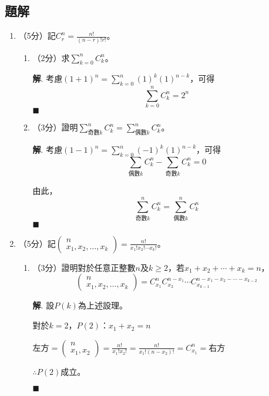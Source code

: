 \documentclass[12pt]{article}
\newenvironment*{sol}{\par \textbf{解}.}{\hfill$\blacksquare$}
\begin{document}
    \subsection*{題解}

    \begin{enumerate}
        \item （5分）記$C_r^n=\frac{n!}{(n-r)!r!}$。\begin{enumerate}
            \item （2分）求$\sum_{k=0}^n C_k^n$。\begin{sol}
                考慮$(1+1)^n=\sum_{k=0}^{n}(1)^k(1)^{n-k}$，可得$$\sum_{k=0}^{n}C_k^n=2^n$$
            \end{sol}
            \item （3分）證明$\sum_{\textrm{奇數}k}^n C_k^n=\sum_{\textrm{偶數}k}^n C_k^n$。\begin{sol}
                考慮$(1-1)^n=\sum_{k=0}^{n}(-1)^k(1)^{n-k}$，可得$$\sum_{\textrm{偶數}k}C_k^n-\sum_{\textrm{奇數}k}C_k^n=0$$

                由此，$$\sum_{\textrm{奇數}k}^n C_k^n=\sum_{\textrm{偶數}k}^n C_k^n$$
            \end{sol}
        \end{enumerate}
        \item （5分）記$\begin{pmatrix}
            n\\x_1,x_2,\dots,x_k
        \end{pmatrix}=\frac{n!}{x_1!x_2!\cdots x_k!}$。\begin{enumerate}
            \item （3分）證明對於任意正整數$n$及$k\geq 2$，若$x_1+x_2+\cdots+x_k=n$，$$\begin{pmatrix}
                n\\x_1,x_2,\dots,x_k
            \end{pmatrix}=C_{x_1}^n C_{x_2}^{n-x_1}\cdots C_{x_{k-1}}^{n-x_1-x_2-\cdots-x_{k-2}}$$\begin{sol}
                設$P(k)$為上述設理。

                對於$k=2$，$P(2)$：$x_1+x_2=n$

                左方$=\begin{pmatrix}
                    n\\x_1,x_2
                \end{pmatrix}=\frac{n!}{x_1!x_2!}=\frac{n!}{x_1!(n-x_2)!}=C_{x_1}^n=$右方

                $\therefore P(2)$成立。


\end{sol}
\end{enumerate}
\end{enumerate}
\end{document}
